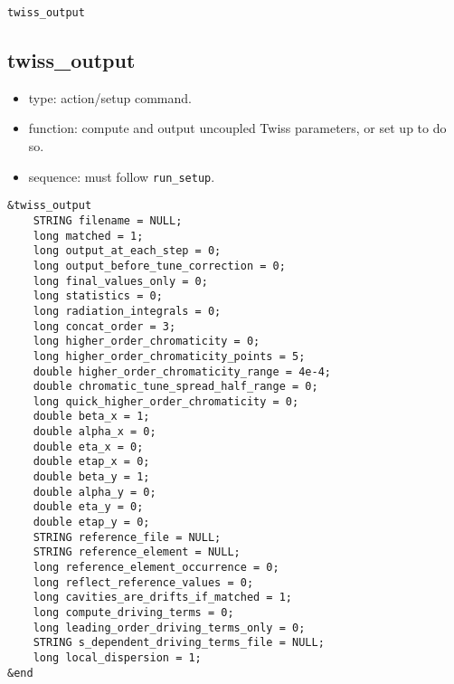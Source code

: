 \documentclass[11pt]{article}
\begin{document}
\newpage
\begin{center}{\Large\verb|twiss_output|}\end{center}
\subsection{twiss\_output \label{subsec:twissoutput}}

\begin{itemize}
\item type: action/setup command.
\item function: compute and output uncoupled Twiss parameters, or set up to do so.
\item sequence: must follow \verb|run_setup|.
\end{itemize}

\begin{verbatim}
&twiss_output
    STRING filename = NULL;
    long matched = 1;
    long output_at_each_step = 0;
    long output_before_tune_correction = 0;
    long final_values_only = 0;
    long statistics = 0;
    long radiation_integrals = 0;
    long concat_order = 3;
    long higher_order_chromaticity = 0;
    long higher_order_chromaticity_points = 5;
    double higher_order_chromaticity_range = 4e-4;
    double chromatic_tune_spread_half_range = 0;
    long quick_higher_order_chromaticity = 0;
    double beta_x = 1;
    double alpha_x = 0;
    double eta_x = 0;
    double etap_x = 0;
    double beta_y = 1;
    double alpha_y = 0;
    double eta_y = 0;
    double etap_y = 0;
    STRING reference_file = NULL;
    STRING reference_element = NULL;
    long reference_element_occurrence = 0;
    long reflect_reference_values = 0;
    long cavities_are_drifts_if_matched = 1;
    long compute_driving_terms = 0;
    long leading_order_driving_terms_only = 0;
    STRING s_dependent_driving_terms_file = NULL;
    long local_dispersion = 1;
&end
\end{verbatim}
\end{document}
